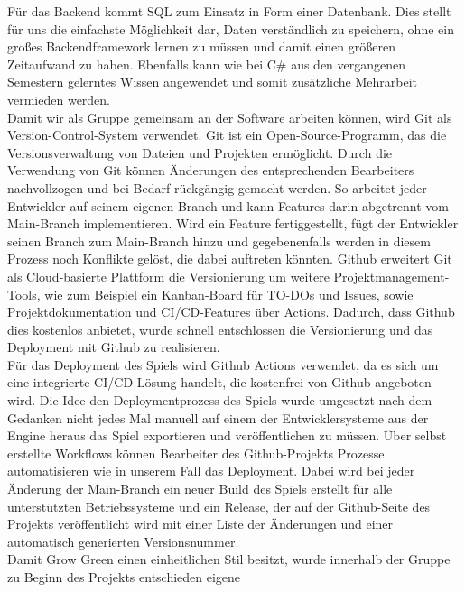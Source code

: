 \newline
Für das Backend kommt SQL zum Einsatz in Form einer Datenbank.
Dies stellt für uns die einfachste Möglichkeit dar, Daten verständlich zu speichern, ohne ein großes Backendframework
lernen zu müssen und damit einen größeren Zeitaufwand zu haben. 
Ebenfalls kann wie bei C\# aus den vergangenen Semestern gelerntes Wissen angewendet und somit zusätzliche 
Mehrarbeit vermieden werden. \\
\newline
Damit wir als Gruppe gemeinsam an der Software arbeiten können, wird Git als Version-Control-System verwendet.
Git ist ein Open-Source-Programm, das die Versionsverwaltung von Dateien und Projekten ermöglicht.
Durch die Verwendung von Git können Änderungen des entsprechenden Bearbeiters nachvollzogen und bei Bedarf rückgängig 
gemacht werden.
So arbeitet jeder Entwickler auf seinem eigenen Branch und kann Features darin abgetrennt vom Main-Branch 
implementieren.
Wird ein Feature fertiggestellt, fügt der Entwickler seinen Branch zum Main-Branch hinzu und gegebenenfalls werden
in diesem Prozess noch Konflikte gelöst, die dabei auftreten könnten.
Github erweitert Git als Cloud-basierte Plattform die Versionierung um weitere Projektmanagement-Tools, wie zum
Beispiel ein Kanban-Board für TO-DOs und Issues, sowie Projektdokumentation und CI/CD-Features über Actions. 
Dadurch, dass Github dies kostenlos anbietet, wurde schnell entschlossen die Versionierung und das Deployment mit Github
zu realisieren.\\
\newline
Für das Deployment des Spiels wird Github Actions verwendet, da es sich um eine integrierte CI/CD-Lösung handelt, die
kostenfrei von Github angeboten wird.
Die Idee den Deploymentprozess des Spiels wurde umgesetzt nach dem Gedanken nicht jedes Mal manuell auf einem der 
Entwicklersysteme aus der Engine heraus das Spiel exportieren und veröffentlichen zu müssen.
Über selbst erstellte Workflows können Bearbeiter des Github-Projekts Prozesse automatisieren wie in unserem Fall das
Deployment. 
Dabei wird bei jeder Änderung der Main-Branch ein neuer Build des Spiels erstellt für alle unterstützten 
Betriebssysteme und ein Release, der auf der Github-Seite des Projekts veröffentlicht wird mit einer Liste der 
Änderungen und einer automatisch generierten Versionsnummer.\\
\newline
Damit Grow Green einen einheitlichen Stil besitzt, wurde innerhalb der Gruppe zu Beginn des Projekts entschieden eigene
